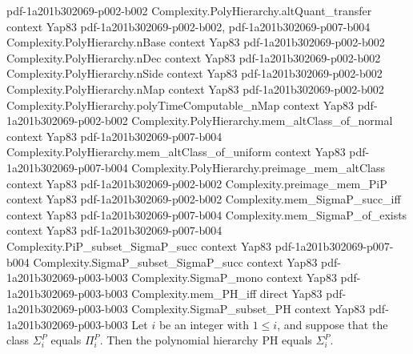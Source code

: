 \begin{theorem}
  {pdf-1a201b302069-p002-b002}
\proofstep
  {Complexity.PolyHierarchy.altQuant_transfer}
  {context}
  {Yap83}
  {pdf-1a201b302069-p002-b002,
    pdf-1a201b302069-p007-b004}
\proofstep
  {Complexity.PolyHierarchy.nBase}
  {context}
  {Yap83}
  {pdf-1a201b302069-p002-b002}
\proofstep
  {Complexity.PolyHierarchy.nDec}
  {context}
  {Yap83}
  {pdf-1a201b302069-p002-b002}
\proofstep
  {Complexity.PolyHierarchy.nSide}
  {context}
  {Yap83}
  {pdf-1a201b302069-p002-b002}
\proofstep
  {Complexity.PolyHierarchy.nMap}
  {context}
  {Yap83}
  {pdf-1a201b302069-p002-b002}
\proofstep
  {Complexity.PolyHierarchy.polyTimeComputable_nMap}
  {context}
  {Yap83}
  {pdf-1a201b302069-p002-b002}
\proofstep
  {Complexity.PolyHierarchy.mem_altClass_of_normal}
  {context}
  {Yap83}
  {pdf-1a201b302069-p007-b004}
\proofstep
  {Complexity.PolyHierarchy.mem_altClass_of_uniform}
  {context}
  {Yap83}
  {pdf-1a201b302069-p007-b004}
\proofstep
  {Complexity.PolyHierarchy.preimage_mem_altClass}
  {context}
  {Yap83}
  {pdf-1a201b302069-p002-b002}
\proofstep
  {Complexity.preimage_mem_PiP}
  {context}
  {Yap83}
  {pdf-1a201b302069-p002-b002}
\proofstep
  {Complexity.mem_SigmaP_succ_iff}
  {context}
  {Yap83}
  {pdf-1a201b302069-p007-b004}
\proofstep
  {Complexity.mem_SigmaP_of_exists}
  {context}
  {Yap83}
  {pdf-1a201b302069-p007-b004}
\proofstep
  {Complexity.PiP_subset_SigmaP_succ}
  {context}
  {Yap83}
  {pdf-1a201b302069-p007-b004}
\proofstep
  {Complexity.SigmaP_subset_SigmaP_succ}
  {context}
  {Yap83}
  {pdf-1a201b302069-p003-b003}
\proofstep
  {Complexity.SigmaP_mono}
  {context}
  {Yap83}
  {pdf-1a201b302069-p003-b003}
\proofstep
  {Complexity.mem_PH_iff}
  {direct}
  {Yap83}
  {pdf-1a201b302069-p003-b003}
\proofstep
  {Complexity.SigmaP_subset_PH}
  {context}
  {Yap83}
  {pdf-1a201b302069-p003-b003}
Let $i$ be an integer with $1 \le i$, and suppose that the class $\Sigma_i^P$ equals
$\Pi_i^P$. Then the polynomial hierarchy $\mathrm{PH}$ equals $\Sigma_i^P$.
\end{theorem}

